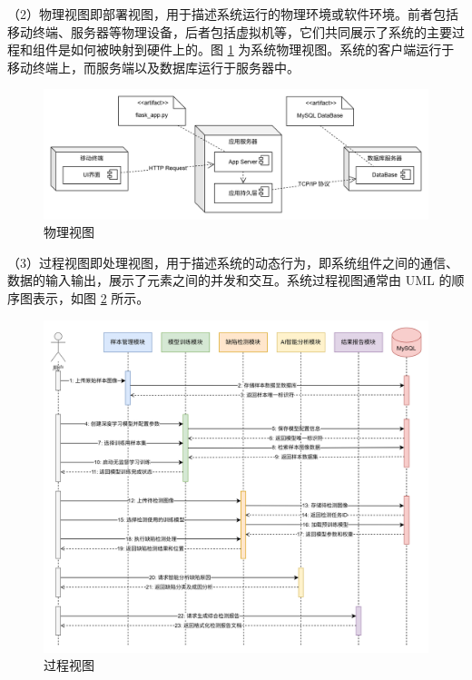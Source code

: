 \documentclass[
  ]{njuthesis}
\begin{document}
（2）物理视图即部署视图，用于描述系统运行的物理环境或软件环境。前者包括移动终端、服务器等物理设备，后者包括虚拟机等，它们共同展示了系统的主要过程和组件是如何被映射到硬件上的。图 \ref{物理视图} 为系统物理视图。系统的客户端运行于移动终端上，而服务端以及数据库运行于服务器中。

\begin{figure}[H]
    \centering
    \includegraphics[width=\textwidth]{images/物理视图.png}
    \caption{物理视图}
    \label{物理视图}
\end{figure}

（3）过程视图即处理视图，用于描述系统的动态行为，即系统组件之间的通信、数据的输入输出，展示了元素之间的并发和交互。系统过程视图通常由 UML 的顺序图表示，如图 \ref{过程视图} 所示。

\begin{figure}[H]
    \centering
    \includegraphics[width=\textwidth]{images/过程视图.png}
    \caption{过程视图}
    \label{过程视图}
\end{figure}
\end{document}
